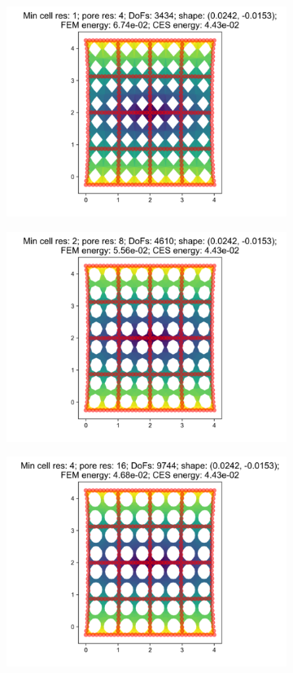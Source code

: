 \begin{figure}[H]
\begin{subfigure}{.45\textwidth}
  \centering
  \includegraphics[width=.8\linewidth]{lces/vis_tension/bm_5_mesh_0.png}
\end{subfigure}
\begin{subfigure}{.45\textwidth}
  \centering
  \includegraphics[width=.8\linewidth]{lces/vis_tension/bm_5_mesh_1.png}
\end{subfigure}
\newline
\begin{subfigure}{.45\textwidth}
  \centering
  \includegraphics[width=.8\linewidth]{lces/vis_tension/bm_5_mesh_2.png}

\end{subfigure}
\end{figure}
